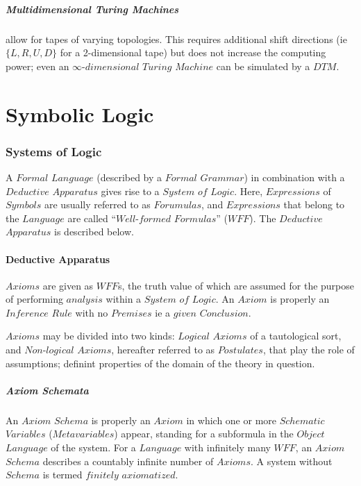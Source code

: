 \documentclass{article}
\begin{document}
\subsubsection{Multidimensional Turing Machines} allow for tapes of
varying topologies. This requires additional shift directions (ie
$\{L, R, U, D\}$ for a 2-dimensional tape) but does not increase the
computing power; even an $\infty$-$dimensional$ $Turing$ $Machine$ can
be simulated by a $DTM$.


\part{Symbolic Logic}

\section{Systems of Logic}

A $Formal$ $Language$ (described by a $Formal$ $Grammar$) in combination
with a $Deductive$ $Apparatus$ gives rise to a $System$ $of$ $Logic$. Here,
$Expressions$ of $Symbols$ are usually referred to as $Forumulas$, and
$Expressions$ that belong to the $Language$ are called
``$Well$-$formed$ $Formulas$'' ($WFF$). The $Deductive$ $Apparatus$ is
described below.

\subsection{Deductive Apparatus}
\label{subsec:deductive_apparatus}

$Axioms$ are given as $WFF$s, the truth value of which are assumed for
the purpose of performing $analysis$ within a $System$ $of$ $Logic$.
An $Axiom$ is properly an $Inference$ $Rule$ with no $Premises$ ie a
$given$ $Conclusion$.

$Axioms$ may be divided into two kinds: $Logical$ $Axioms$ of a
tautological sort, and $Non$-$logical$ $Axioms$, hereafter referred to
as $Postulates$, that play the role of assumptions; definint
properties of the domain of the theory in question.

\subsubsection{Axiom Schemata}

An $Axiom$ $Schema$ is properly an $Axiom$ in which one or more
$Schematic$ $Variables$ ($Metavariables$) appear, standing for a
subformula in the $Object$ $Language$ of the system. For a $Language$
with infinitely many $WFF$, an $Axiom$ $Schema$ describes a countably
infinite number of $Axioms$. A system without $Schema$ is termed
$finitely$ $axiomatized$.
\end{document}
